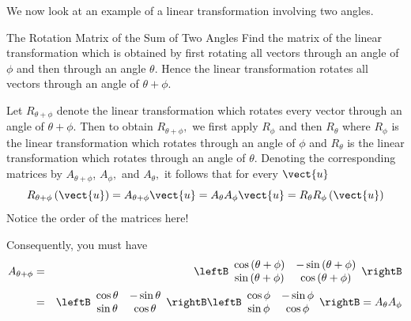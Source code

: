 We now look at an example of a linear transformation involving two angles.

\begin{example}{The Rotation Matrix of the Sum of Two Angles}\label{exa:rotationmatrixtwoangles}
Find the matrix of the linear transformation which is
obtained by first rotating all vectors through an angle of $\phi $ and then
through an angle $\theta .$ Hence the linear transformation 
rotates all vectors through an angle of $\theta +\phi .$
\end{example}

\begin{solution}
Let $R_{\theta +\phi }$ denote the linear transformation which rotates every
vector through an angle of $\theta +\phi .$ 
Then to obtain $R_{\theta +\phi },$
we first apply $R_{\phi }$ and then $R_{\theta }$ where $R_{\phi }$
is the linear transformation which rotates through an angle of $\phi $ and 
$R_{\theta }$ is the linear transformation which rotates through an angle of 
$\theta $. Denoting the corresponding matrices by $A_{\theta +\phi }$, 
$A_{\phi },$ and $A_{\theta },$ it follows that for every $\vect{u}$
\begin{equation*}
R_{\theta +\phi }\left(\vect{u}\right)=A_{\theta +\phi }\vect{u}=A_{\theta }A_{\phi }\vect{u} = R_{\theta }R_{\phi }
\left(\vect{u}\right)
\end{equation*}
Notice the order of the matrices here! 

Consequently, you must have
\begin{eqnarray*}
A_{\theta +\phi } &=&\leftB
\begin{array}{cc}
\cos \left( \theta +\phi \right) & -\sin \left( \theta +\phi \right) \\
\sin \left( \theta +\phi \right) & \cos \left( \theta +\phi \right)
\end{array}
\rightB\\
&=&\leftB
\begin{array}{cc}
\cos \theta & -\sin \theta \\
\sin \theta & \cos \theta
\end{array}
\rightB \leftB
\begin{array}{cc}
\cos \phi & -\sin \phi \\
\sin \phi & \cos \phi
\end{array}
\rightB 
 =A_{\theta }A_{\phi } 
\end{eqnarray*}


\end{solution}

